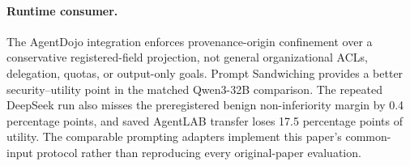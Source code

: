 \paragraph{Runtime consumer.}
The AgentDojo integration enforces provenance-origin confinement over a
conservative registered-field projection, not general organizational ACLs,
delegation, quotas, or output-only goals. Prompt Sandwiching provides a better
security--utility point in the matched Qwen3-32B comparison. The repeated
DeepSeek run also misses the preregistered benign non-inferiority margin by 0.4
percentage points, and saved AgentLAB transfer loses 17.5 percentage points of
utility. The comparable prompting adapters implement this paper's common-input
protocol rather than reproducing every original-paper evaluation.
